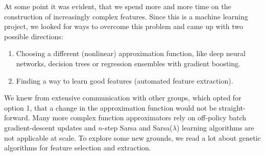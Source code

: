 At some point it was evident, that we spend more and more time on the construction of increasingly complex features. Since this is a machine learning project, we looked for ways to overcome this problem and came up with two possible directions:
\begin{enumerate}
	\item Choosing a different (nonlinear) approximation function, like deep neural networks, decision trees or regression ensembles with gradient boosting.
	\item Finding a way to learn good features (automated feature extraction).
\end{enumerate}
 
We knew from extensive communication with other groups, which opted for option 1, that a change in the approximation function would not be straight-forward. Many more complex function approximators rely on off-policy batch gradient-descent updates and $n$-step Sarsa and Sarsa($\lambda$) learning algorithms are not applicable at scale. To explore some new grounds, we read a lot about genetic algorithms for feature selection and extraction. 

